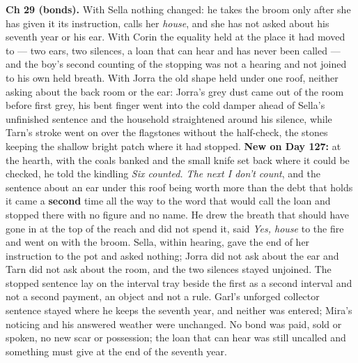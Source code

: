 \documentclass{design/chronicle}
\begin{document}
{\textbf{Ch 29 (bonds).} With Sella nothing changed: he takes the broom only after she has given it its instruction, calls her \emph{house}, and she has not asked about his seventh year or his ear. With Corin the equality held at the place it had moved to — two ears, two silences, a loan that can hear and has never been called — and the boy’s second counting of the stopping was not a hearing and not joined to his own held breath. With Jorra the old shape held under one roof, neither asking about the back room or the ear: Jorra’s grey dust came out of the room before first grey, his bent finger went into the cold damper ahead of Sella’s unfinished sentence and the household straightened around his silence, while Tarn’s stroke went on over the flagstones without the half-check, the stones keeping the shallow bright patch where it had stopped. \textbf{New on Day 127:} at the hearth, with the coals banked and the small knife set back where it could be checked, he told the kindling \emph{Six counted. The next I don’t count}, and the sentence about an ear under this roof being worth more than the debt that holds it came a \textbf{second} time all the way to the word that would call the loan and stopped there with no figure and no name. He drew the breath that should have gone in at the top of the reach and did not spend it, said \emph{Yes, house} to the fire and went on with the broom. Sella, within hearing, gave the end of her instruction to the pot and asked nothing; Jorra did not ask about the ear and Tarn did not ask about the room, and the two silences stayed unjoined. The stopped sentence lay on the interval tray beside the first as a second interval and not a second payment, an object and not a rule. Garl’s unforged collector sentence stayed where he keeps the seventh year, and neither was entered; Mira’s noticing and his answered weather were unchanged. No bond was paid, sold or spoken, no new scar or possession; the loan that can hear was still uncalled and something must give at the end of the seventh year.

}
\end{document}
